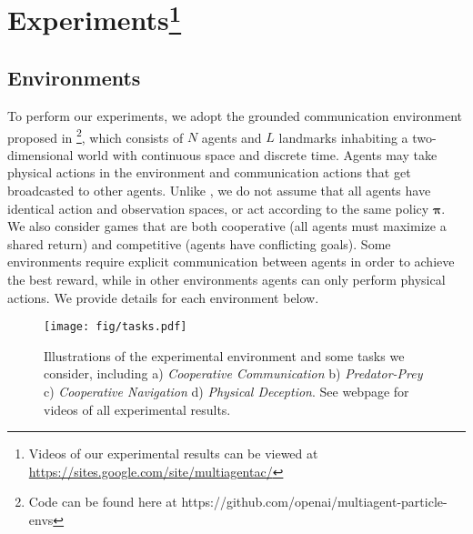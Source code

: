 \documentclass{article}
\newcommand{\pol}[0]{\pmb{\pi}}
\newcommand{\insertfigure}[3]{
\begin{figure}[ht]
\centering
\texttt{[image: fig/\#1]}
\caption{#3}
\label{fig:#1}
\end{figure}
}
\newcommand{\hide}[1]{}
\begin{document}
\section{Experiments\protect\footnote[1]{
Videos of our experimental results can be viewed at \href{https://sites.google.com/site/multiagentac/}{https://sites.google.com/site/multiagentac/}}}
\label{sec:experiments}

\subsection{Environments}
\label{sec:environments}
To perform our experiments, we adopt the grounded communication environment proposed in \cite{mordatch2017emergence}\footnote{Code can be found here at https://github.com/openai/multiagent-particle-envs}, which consists of $N$ agents and $L$ landmarks inhabiting a two-dimensional world with continuous space and discrete time. Agents may take physical actions in the environment and communication actions that get broadcasted to other agents. Unlike  \cite{mordatch2017emergence}, we do not assume that all agents have identical action and observation spaces, or act according to the same policy $\pol$. We also consider games that are both cooperative (all agents must maximize a shared return) and competitive (agents have conflicting goals). Some environments require explicit communication between agents in order to achieve the best reward, while in other environments agents can only perform physical actions. We provide details for each environment below.


\hide{
\insertfigure{tasks}{1.00}{Illustrations of the experimental environment and some tasks we consider, including a) \emph{Cooperative Communication} b) \emph{Predator-Prey} c) \emph{Cooperative Navigation} d) \emph{Physical Deception}. See webpage for videos of all experimental results.}
}

\begin{figure}[ht]
\centering
\texttt{[image: fig/tasks.pdf]}
\caption{Illustrations of the experimental environment and some tasks we consider, including a) \emph{Cooperative Communication} b) \emph{Predator-Prey} c) \emph{Cooperative Navigation} d) \emph{Physical Deception}. See webpage for videos of all experimental results.\vspace{-2mm}}
\label{fig:tasks}
\end{figure}
\end{document}
